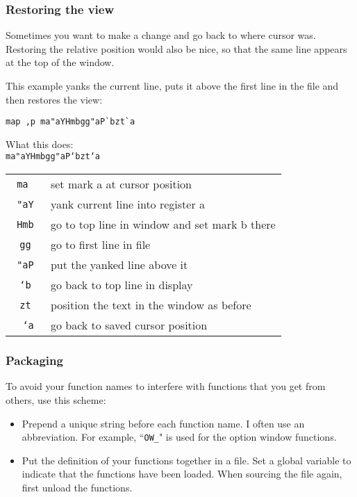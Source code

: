 \subsubsection{Restoring the view}
Sometimes you want to make a change and go back to where cursor was.
Restoring the relative position would also be nice, so that the same line appears at the top of the window.

This example yanks the current line, puts it above the first line in the file and then restores the view:

\begin{Verbatim}[samepage=true]
 map ,p ma"aYHmbgg"aP`bzt`a
\end{Verbatim}

What this does:\\
\texttt{ma"aYHmbgg"aP`bzt`a}
\begin{center} \begin{tabular}{c l} %
\texttt{ma                 } & set mark a at cursor position \\
\texttt{  "aY              } & yank current line into register a \\
\texttt{     Hmb           } & go to top line in window and set mark b there \\
\texttt{        gg         } & go to first line in file \\
\texttt{          "aP      } & put the yanked line above it \\
\texttt{             `b    } & go back to top line in display \\
\texttt{               zt  } & position the text in the window as before \\
\texttt{                 `a} & go back to saved cursor position \\
\end{tabular} \end{center}

\subsubsection{Packaging}
To avoid your function names to interfere with functions that you get from others, use this scheme:
\begin{itemize} 
				\item Prepend a unique string before each function name.
								I often use an abbreviation.
								For example, ``\texttt{OW\_}" is used for the option window functions.
				\item Put the definition of your functions together in a file.
								Set a global variable to indicate that the functions have been loaded.
								When sourcing the file again, first unload the functions.
\end{itemize}


